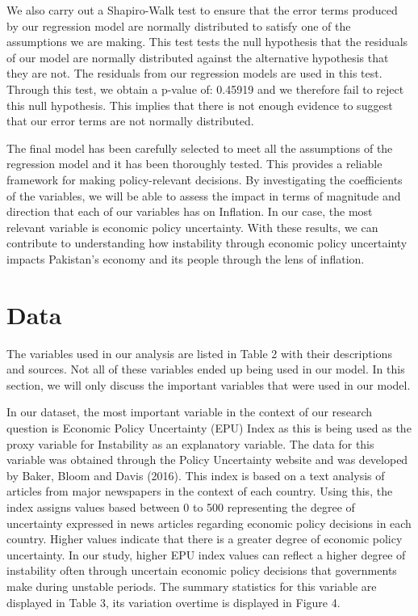 \documentclass[11pt]{article}
\begin{document}
We also carry out a Shapiro-Walk test to ensure that the error terms produced by our regression model are normally distributed to satisfy one of the assumptions we are making. This test tests the null hypothesis that the residuals of our model are normally distributed against the alternative hypothesis that they are not. The residuals from our regression models are used in this test. Through this test, we obtain a p-value of: 0.45919 and we therefore fail to reject this null hypothesis. This implies that there is not enough evidence to suggest that our error terms are not normally distributed. \newline

The final model has been carefully selected to meet all the assumptions of the regression model and it has been thoroughly tested. This provides a reliable framework for making policy-relevant decisions. By investigating the coefficients of the variables, we will be able to assess the impact in terms of magnitude and direction that each of our variables has on Inflation. In our case, the most relevant variable is economic policy uncertainty. With these results, we can contribute to understanding how instability through economic policy uncertainty impacts Pakistan’s economy and its people through the lens of inflation.

\section{Data}
The variables used in our analysis are listed in Table 2 with their descriptions and sources. Not all of these variables ended up being used in our model. In this section, we will only discuss the important variables that were used in our model. \newline

In our dataset, the most important variable in the context of our research question is Economic Policy Uncertainty (EPU) Index as this is being used as the proxy variable for Instability as an explanatory variable. The data for this variable was obtained through the Policy Uncertainty website and was developed by Baker, Bloom and Davis (2016). This index is based on a text analysis of articles from major newspapers in the context of each country. Using this, the index assigns values based between 0 to 500 representing the degree of uncertainty expressed in news articles regarding economic policy decisions in each country. Higher values indicate that there is a greater degree of economic policy uncertainty. In our study, higher EPU index values can reflect a higher degree of instability often through uncertain economic policy decisions that governments make during unstable periods. The summary statistics for this variable are displayed in Table 3, its variation overtime is displayed in Figure 4. \newline
\end{document}
